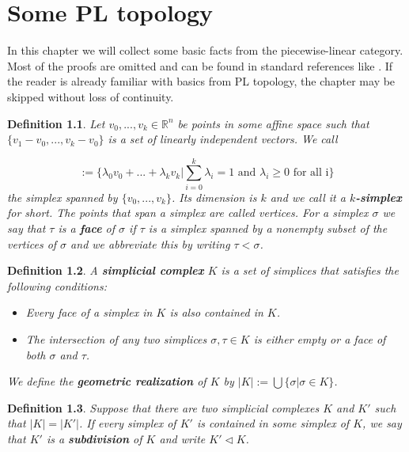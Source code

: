 \documentclass[11pt]{book}
\newtheorem{definition}{Definition}
\begin{document}
\tableofcontents

\chapter{Some PL topology}
\label{sec:Einleitung}

In this chapter we will collect some basic facts from the piecewise-linear category. Most of the proofs are omitted and can be found in standard references like \cite{pltopo}. If the reader is already familiar with basics from PL topology, the chapter may be skipped without loss of continuity.


\begin{definition}
Let $v_0,...,v_k \in \mathbb{R}^n$ be points in some affine space such that $\{ v_1-v_0,...,v_k-v_0 \}$ is a set of linearly independent vectors. We call

\begin{equation}
[v_0,...,v_k] := \Biggl \{  \lambda_0v_0+...+ \lambda_kv_k \Bigg |  \sum_{i=0}^k \lambda_i =1 \text{ and } \lambda_i \geq 0 \text{ for all i} \Biggr \}
\end{equation}
the simplex spanned by $\{v_0,...,v_k \}$. Its dimension is $k$ and we call it a \textbf{$k$-simplex} for short. The points that span a simplex are called vertices. For a simplex $\sigma$ we say that $\tau$ is a \textbf{face} of $\sigma$ if $\tau$ is a simplex spanned by a nonempty subset of the vertices of $\sigma$ and we abbreviate this by writing $\tau < \sigma$.
\end{definition}

\begin{definition}
A \textbf{simplicial complex} $K$ is a set of simplices that satisfies the following conditions:

\begin{itemize}
\item Every face of a simplex in $K$ is also contained in $K$.
\item The intersection of any two simplices $\sigma, \tau \in K$ is either empty or a face of both $\sigma$ and $\tau$.
\end{itemize}

We define the \textbf{geometric realization} of $K$ by $|K|:= \bigcup \{ \sigma | \sigma \in K \}$.

\end{definition}


\begin{definition}
Suppose that there are two simplicial complexes $K$ and $K'$ such that $|K| = |K'|$. If every simplex of $K'$ is contained in some simplex of $K$, we say that $K'$ is a \textbf{subdivision} of $K$ and write $K' \lhd K$.
\end{definition}
\end{document}
